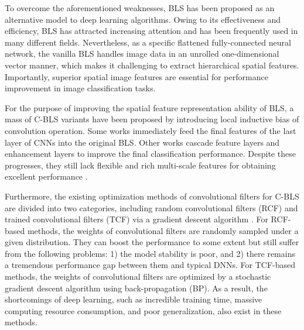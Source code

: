 \documentclass[lettersize,journal]{IEEEtran}
\begin{document}
To overcome the aforementioned weaknesses, BLS has been proposed as an alternative model to deep learning algorithms\cite{chen2017broad,chen2018universal}. Owing to its effectiveness and efficiency, BLS has attracted increasing attention and has been frequently used in many different fields\cite{gong2021research}. Nevertheless, as a specific flattened fully-connected neural network, the vanilla BLS handles image data in an unrolled one-dimensional vector manner, which makes it challenging to extract hierarchical spatial features\cite{chen2018universal}. Importantly, superior spatial image features are essential for performance improvement in image classification tasks\cite{lecun1989handwritten, liu2017broad, liu2021multi}.

For the purpose of improving the spatial feature representation ability of BLS, a mass of C-BLS variants\cite{chen2018universal, yang2018cnn, yu2019broad, li2019cnn, chen2020cnn, tang2020combining, ma2021multiscale} have been proposed by introducing local inductive bias of convolution operation. Some works\cite{chen2020cnn, tang2020combining} immediately feed the final features of the last layer of CNNs into the original BLS. Other works\cite{chen2018universal, yang2018cnn, yu2019broad, li2019cnn} cascade feature layers and enhancement layers to improve the final classification performance. Despite these progresses, they still lack flexible and rich multi-scale features for obtaining excellent performance \cite{grauman2005pyramid, lazebnik2006beyond}.

Furthermore, the existing optimization methods of convolutional filters for C-BLS are divided into two categories, including random convolutional filters (RCF)\cite{chen2018universal, yang2018cnn, yu2019broad, chen2020cnn, tang2020combining, ma2021multiscale} and trained convolutional filters (TCF) via a gradient descent algorithm \cite{li2019cnn}. For RCF-based methods, the weights of convolutional filters are randomly sampled under a given distribution. They can boost the performance to some extent but still suffer from the following problems: 1) the model stability is poor, and 2) there remains a tremendous performance gap between them and typical DNNs. For TCF-based methods, the weights of convolutional filters are optimized by a stochastic gradient descent algorithm using back-propagation (BP). 
As a result, the shortcomings of deep learning, such as incredible training time, massive computing resource consumption, and poor generalization, also exist in these methods.
\end{document}
